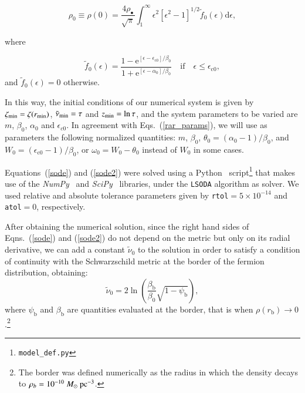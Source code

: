 \documentclass[twocolumn]{aa}
\begin{document}
\begin{appendix}
\begin{equation}
    \rho_0\equiv \rho(0) = \frac{4\rho_{\bullet}}{\sqrt{\pi}}\int^\infty_1\epsilon^2[\epsilon^2-1]^{1/2}\tilde{f}_0(\epsilon)\mathrm{d}\epsilon,
\end{equation}

where

\begin{equation}
\tilde{f}_0(\epsilon)=
      \frac{1-\mathrm {e}^{[\epsilon-\epsilon_\mathrm{c0}]/\beta_0}}
      {1+\mathrm {e}^{[\epsilon-\alpha_0]/\beta_0}}\quad\mathrm{if}\quad \epsilon \leq \epsilon_\mathrm{c0},
\end{equation}
and $\tilde{f}_0(\epsilon)=0$ otherwise.

In this way, the initial conditions of our numerical system is given
by $\zeta_{\rm{min}}=\zeta(r_{\rm{min}})$,
$\tilde{\nu}_{\rm{min}}=\tau$ and $z_{\rm{min}}=\ln{\tau}$, and the system parameters to be varied are $m$, $\beta_0$, $\alpha_0$ and $\epsilon_{c0}$.
In agreement with Eqs.~(\ref{rar_params}), we will use as parameters the following normalized quantities: $m$, $\beta_0$, $\theta_0=(\alpha_0-1)/\beta_0$, and $W_0=(\epsilon_{\mathrm{c}0}-1)/\beta_0$, or $\omega_0=W_0-\theta_0$ instead of $W_0$ in some cases.

Equations~(\ref{sode}) and (\ref{sode2}) were solved using
a {\sc Python}~\citep{van1995python} script\footnote{\texttt{model\_def.py}}
that makes use of the {\it NumPy}~\citep{2020SciPy-NMeth} and {\it SciPy}~\citep{harris2020array} libraries, under the \texttt{LSODA} algorithm as solver.  We used relative and absolute tolerance parameters given by \texttt{rtol}$=5\times10^{-14}$ and \texttt{atol}$=0$, respectively.

After obtaining the numerical solution, since the right hand sides of Eqns.~(\ref{sode}) and (\ref{sode2}) do not depend on the metric but only on its radial derivative, we can add
a constant $\tilde{\nu}_0$ to the solution in order to satisfy a condition of continuity with the Schwarzschild metric at the border of the fermion distribution, obtaining:
\begin{equation}
\tilde{\nu}_0 = 2\ln\left(\frac{\beta_\mathrm{b}}{\beta_0}\sqrt{1-\psi_\mathrm{b}}\right),
\end{equation}
where $\psi_\mathrm{b}$ and $\beta_\mathrm{b}$ are quantities evaluated at the border, that is when
$\rho(r_\mathrm{b})\rightarrow 0$.\footnote{The border was defined numerically as the radius in which
the density decays to $\rho_b=10^{-10}~M_\odot~\rm{pc}^{-3}$.}


\end{appendix}
\end{document}
